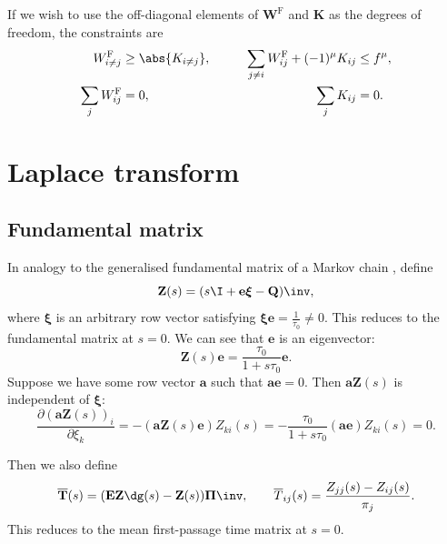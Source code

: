 \documentclass[12pt]{article}
\newcommand{\onev}{\mathbf{e}}
\newcommand{\onem}{\mathbf{E}}
\newcommand{\MMm}{Q}
\newcommand{\MM}{\mathbf{\MMm}}
\newcommand{\eqm}{\pi}
\newcommand{\Eqm}{\Pi}
\newcommand{\Eq}{\boldsymbol{\Eqm}}
\newcommand{\fptm}{T}
\newcommand{\fpt}{\mathbf{\fptm}}
\newcommand{\fptbm}{\overline{\fptm}}
\newcommand{\fptb}{\overline{\fpt}}
\newcommand{\fundm}{Z}
\newcommand{\fund}{\mathbf{\fundm}}
\newcommand{\arowm}{\xi}
\newcommand{\arow}{\boldsymbol{\arowm}}
\newcommand{\Wm}{W}
\newcommand{\W}{\mathbf{\Wm}}
\newcommand{\encm}{K}
\newcommand{\enc}{\mathbf{\encm}}
\newcommand{\frgm}{\Wm^{\mathrm{F}}}
\newcommand{\frg}{\W^{\mathrm{F}}}
\renewcommand{\pdiff}[2]{\frac{\partial #1}{\partial #2}}
\begin{document}
If we wish to use the off-diagonal elements of $\frg$ and $\enc$ as the degrees of freedom, the constraints are
%
\begin{equation}\label{eq:constrfe}
\begin{aligned}
  \frgm_{i \neq j}   &\geq \abs{ \encm_{i \neq j} }, &\qquad
  \sum_{j\neq i}\frgm_{ij} + (-1)^\mu \encm_{ij}  &\leq f^\mu, \\
  \sum_j \frgm_{ij} &=0, &
  \sum_j \encm_{ij} &=0.
\end{aligned}
\end{equation}
%



\section{Laplace transform}\label{sec:laplace}


\subsection{Fundamental matrix \etc}\label{sec:lfund}

In analogy to the generalised fundamental matrix of a Markov chain \cite{Kemeny1981fund}, define
%
\begin{equation}\label{eq:lfund}
  \fund(s) = (s \I + \onev \arow -\MM)\inv,
\end{equation}
%
where $\arow$ is an arbitrary row vector satisfying $\arow \onev = \frac{1}{\tau_0} \neq 0$.
This reduces to the fundamental matrix at $s=0$.
We can see that $\onev$ is an eigenvector:
%
\begin{equation}\label{eq:lfundrowsum}
  \fund(s)\onev = \frac{\tau_0}{1+s\tau_0}\onev.
\end{equation}
%
Suppose we have some row vector $\mathbf{a}$ such that $\mathbf{a}\onev=0$.
Then $\mathbf{a}\fund(s)$ is independent of $\arow$:
%
\begin{equation}\label{eq:alfund}
  \pdiff{(\mathbf{a}\fund(s))_i}{\arowm_k} = -(\mathbf{a}\fund(s)\onev) \fundm_{ki}(s)
      = -\frac{\tau_0}{1+s\tau_0} (\mathbf{a}\onev) \fundm_{ki}(s) = 0.
\end{equation}
%

Then we also define
%
\begin{equation}\label{eq:lfptb}
  \fptb(s) = (\onem \fund\dg(s)-\fund(s))\Eq\inv,
  \qquad
  \fptbm_{ij}(s) = \frac{\fundm_{jj}(s)-\fundm_{ij}(s)}{\eqm_j}.
\end{equation}
%
This reduces to the mean first-passage time matrix at $s=0$. 
\end{document}
